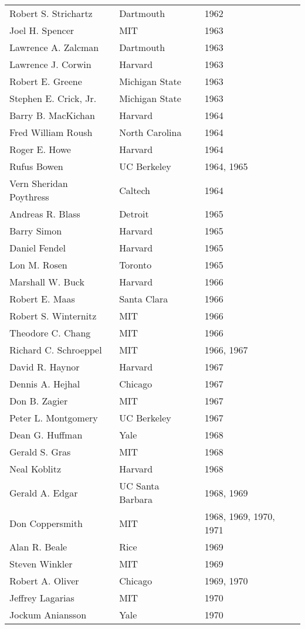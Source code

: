 \documentclass[12pt]{article}
\begin{document}
\begin{tabular}{|l|l|l|}
Robert S. Strichartz & Dartmouth & 1962 \\
Joel H. Spencer & MIT & 1963 \\
Lawrence A. Zalcman & Dartmouth & 1963 \\
Lawrence J. Corwin & Harvard & 1963 \\
Robert E. Greene & Michigan State & 1963 \\
Stephen E. Crick, Jr. & Michigan State & 1963 \\
Barry B. MacKichan & Harvard & 1964 \\
Fred William Roush & North Carolina & 1964 \\
Roger E. Howe & Harvard & 1964 \\
Rufus Bowen & UC Berkeley & 1964, 1965 \\
Vern Sheridan Poythress & Caltech & 1964 \\
Andreas R. Blass & Detroit & 1965 \\
Barry Simon & Harvard & 1965 \\
Daniel Fendel & Harvard & 1965 \\
Lon M. Rosen & Toronto & 1965 \\
Marshall W. Buck & Harvard & 1966 \\
Robert E. Maas & Santa Clara & 1966 \\
Robert S. Winternitz & MIT & 1966 \\
Theodore C. Chang & MIT & 1966 \\
Richard C. Schroeppel & MIT & 1966, 1967 \\
David R. Haynor & Harvard & 1967 \\
Dennis A. Hejhal & Chicago & 1967 \\
Don B. Zagier & MIT & 1967 \\
Peter L. Montgomery & UC Berkeley & 1967 \\
Dean G. Huffman & Yale & 1968 \\
Gerald S. Gras & MIT & 1968 \\
Neal Koblitz & Harvard & 1968 \\
Gerald A. Edgar & UC Santa Barbara & 1968, 1969 \\
Don Coppersmith & MIT & 1968, 1969, 1970, 1971 \\
Alan R. Beale & Rice & 1969 \\
Steven Winkler & MIT & 1969 \\
Robert A. Oliver & Chicago & 1969, 1970 \\
Jeffrey Lagarias & MIT & 1970 \\
Jockum Aniansson & Yale & 1970 \\

\end{tabular}
\end{document}
